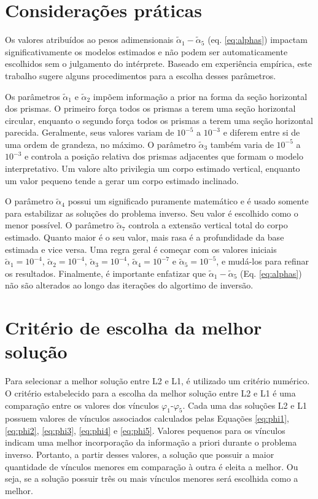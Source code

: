 \section{Considerações práticas}

Os valores atribuídos ao pesos adimensionais $\tilde{\alpha}_{1} - \tilde{\alpha}_{5}$ (eq. \ref{eq:alphas}) impactam significativamente os modelos estimados e não podem ser automaticamente escolhidos sem o julgamento do intérprete.
Baseado em experiência empírica, este trabalho sugere alguns procedimentos para a escolha desses parâmetros.

Os parâmetros $\tilde{\alpha}_1$ e $\tilde{\alpha}_2$ impõem informação a prior na forma da seção horizontal dos prismas.
O primeiro força todos os prismas a terem uma seção horizontal circular, enquanto o segundo força todos os prismas a terem uma seção horizontal parecida.
Geralmente, seus valores variam de $10^{-5}$ a $10^{-3}$ e diferem entre si de uma ordem de grandeza, no máximo.
O parâmetro $\tilde{\alpha}_3$ também varia de $10^{-5}$ a $10^{-3}$ e controla a posição relativa dos prismas adjacentes que formam o modelo interpretativo.
Um valore alto privilegia um corpo estimado vertical, enquanto um valor pequeno tende a gerar um corpo estimado inclinado.

O parâmetro $\tilde{\alpha}_4$ possui um significado puramente matemático e é usado somente para estabilizar as soluções do problema inverso.
Seu valor é escolhido como o menor possível.
O parâmetro $\tilde{\alpha}_7$ controla a extensão vertical total do corpo estimado.
Quanto maior é o seu valor, mais rasa é a profundidade da base estimada e vice versa.
Uma regra geral é começar com os valores iniciais $\tilde{\alpha}_1 = 10^{-4}$, $\tilde{\alpha}_2 = 10^{-4}$, $\tilde{\alpha}_3 = 10^{-4}$, $\tilde{\alpha}_4 = 10^{-7}$ e $\tilde{\alpha}_5 = 10^{-5}$, e mudá-los para refinar os resultados.
Finalmente, é importante enfatizar que  $\tilde{\alpha}_1 - \tilde{\alpha}_5$ (Eq. \ref{eq:alphas}) não são alterados ao longo das iterações do algortimo de inversão.

\section{Critério de escolha da melhor solução}
\label{sec:criterio}

Para selecionar a melhor solução entre L2 e L1, é utilizado um critério numérico.
O critério estabelecido para a escolha da melhor solução entre L2 e L1 é uma comparação entre os valores dos vínculos $ \varphi_1 $-$ \varphi_5 $.
Cada uma das soluções L2 e L1 possuem valores de vínculos associados calculados pelas Equações \ref{eq:phi1}, \ref{eq:phi2}, \ref{eq:phi3}, \ref{eq:phi4} e \ref{eq:phi5}.
Valores pequenos para os vínculos indicam uma melhor incorporação da informação a priori durante o problema inverso.
Portanto, a partir desses valores, a solução que possuir a maior quantidade de vínculos menores em comparação à outra é eleita a melhor.
Ou seja, se a solução possuir três ou mais vínculos menores será escolhida como a melhor.